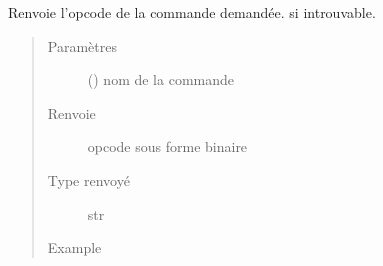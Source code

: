 \documentclass[letterpaper,10pt,french]{sphinxmanual}
\begin{document}
\begin{fulllineitems}
\begin{fulllineitems}
\begin{quote}
\begin{description}
\begin{sphinxVerbatim}[commandchars=\\\{\}]
\end{sphinxVerbatim}

\end{description}\end{quote}

\end{fulllineitems}


\begin{fulllineitems}
\label{\detokenize{processorengine:processorengine.ProcessorEngine.getOpcode}}
Renvoie l’opcode de la commande demandée. \sphinxcode{\sphinxupquote{\textquotesingle{}\textquotesingle{}}} si introuvable.
\begin{quote}\begin{description}
\item[{Paramètres}] \leavevmode
{} () \textendash{} nom de la commande

\item[{Renvoie}] \leavevmode
opcode sous forme binaire

\item[{Type renvoyé}] \leavevmode
str

\item[{Example}] \leavevmode
\begin{sphinxVerbatim}[commandchars=\\\{\}]
\end{sphinxVerbatim}

\begin{sphinxVerbatim}[commandchars=\\\{\}]
\end{sphinxVerbatim}


\end{description}
\end{quote}
\end{fulllineitems}
\end{fulllineitems}
\end{document}
